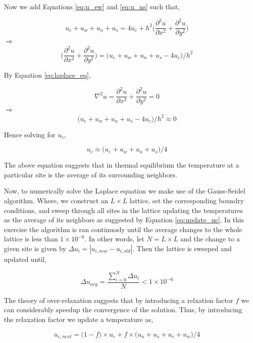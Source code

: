 \documentclass{article}
\begin{document}
Now we add Equations \ref{eq:u_ew} and \ref{eq:u_ns} such that,

$$
  u_{e} + u_{w} + u_{n} + u_{s} = 4u_{c} + h^{2}\bigg(\frac{\partial^2 u}{\partial x^2} + \frac{\partial^2 u}{\partial y^2}\bigg)
$$
$\Rightarrow$
$$
  \bigg(\frac{\partial^2 u}{\partial x^2} + \frac{\partial^2 u}{\partial y^2}\bigg) = \big(u_{e} + u_{w} + u_{n} + u_{s} - 4u_{c}\big)/h^{2}
$$

By Equation \ref{eq:laplace_eq},

$$
  \nabla^{2}u = \frac{\partial^2 u}{\partial x^2} + \frac{\partial^2 u}{\partial y^2} = 0
$$
$\Rightarrow$
$$
  \big(u_{e} + u_{w} + u_{n} + u_{s} - 4u_{c}\big)/h^{2} \approx 0
$$

Hence solving for $u_{c}$,

\begin{equation}
\label{eq:u_c_final}
 u_{c} \approx \big(u_{e} + u_{w} + u_{n} + u_{s}\big)/4
\end{equation}

The above equation suggests that in thermal equilibrium the temperature at a particular site is the average of its surrounding neighbors.


Now, to numerically solve the Laplace equation we make use of the Gauss-Seidel algorithm. Where, we construct an $L \times L$ lattice, set the corresponding
boundry conditions, and sweep through all sites in the lattice updating the temperatures as the average of its neighbors as suggested by Equation \ref{eq:update_uc}.
In this exercise the algorithm is ran continuosly until the average changes to the whole lattice is less than $1 \times 10^{-6}$. In other words, let $N = L \times L$ and
the change to a given site is given by $\Delta u_{i} = |u_{i, new} - u_{i, old}|$. Then the lattice is sweeped and updated until,

\begin{equation}
\label{eq:limit_uc}
  \Delta u_{avg} = \frac{\sum_{i=0}^{N} \Delta u_{i}}{N} < 1 \times 10^{-6}
\end{equation}


The theory of over-relaxation suggests that by introducing a relxation factor $f$ we can considerably speedup the convergence of the solution. Thus, by introducing the
relaxation factor we update a temperature as,

\begin{equation}
\label{eq:update_uc}
  u_{c, next} = \big(1 - f\big) \times u_{c} + f \times \big(u_{n} + u_{s} + u_{e} + u_{w}\big)/4
\end{equation}
\end{document}
